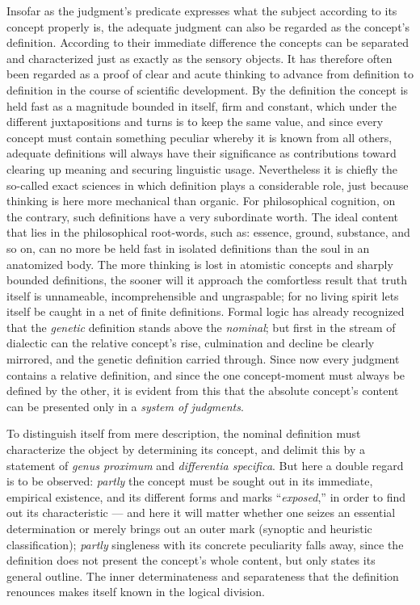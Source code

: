 \documentclass[12pt]{book}
\begin{document}
Insofar as the judgment's predicate expresses what the subject according to
its concept properly is, the adequate judgment can also be regarded as the
concept's definition. According to their immediate difference the concepts
can be separated and characterized just as exactly as the sensory objects.
It has therefore often been regarded as a proof of clear and acute thinking
to advance from definition to definition in the course of scientific
development. By the definition the concept is held fast as a magnitude
bounded in itself, firm and constant, which under the different
juxtapositions and turns is to keep the same value, and since every concept
must contain something peculiar whereby it is known from all others,
adequate definitions will always have their significance as contributions
toward clearing up meaning and securing linguistic usage. Nevertheless it is
chiefly the so-called exact sciences in which definition plays a
considerable role, just because thinking is here more mechanical than
organic. For philosophical cognition, on the contrary, such definitions have
a very subordinate worth. The ideal content that lies in the philosophical
root-words, such as: essence, ground, substance, and so on, can no more be
held fast in isolated definitions than the soul in an anatomized body. The
more thinking is lost in atomistic concepts and sharply bounded definitions,
the sooner will it approach the comfortless result that truth itself is
unnameable, incomprehensible and ungraspable; for no living spirit lets
itself be caught in a net of finite definitions. Formal logic has already
recognized that the \emph{genetic} definition stands above the
\emph{nominal}; but first in the stream of dialectic can the relative
concept's rise, culmination and decline be clearly mirrored, and the genetic
definition carried through. Since now every judgment contains a relative
definition, and since the one concept-moment must always be defined by the
other, it is evident from this that the absolute concept's content can be
presented only in a \emph{system of judgments}.

To distinguish itself from mere description, the nominal definition must
characterize the object by determining its concept, and delimit this by a
statement of \textit{genus proximum} and \textit{differentia specifica}.
But here a double regard is to be observed: \emph{partly} the concept must
be sought out in its immediate, empirical existence, and its different forms
and marks ``\emph{exposed},'' in order to find out its characteristic ---
and here it will matter whether one seizes an essential determination or
merely brings out an outer mark (synoptic and heuristic classification);
\emph{partly} singleness with its concrete peculiarity falls away, since the
definition does not present the concept's whole content, but only states its
general outline. The inner determinateness and separateness that the
definition renounces makes itself known in the logical division.
\end{document}
